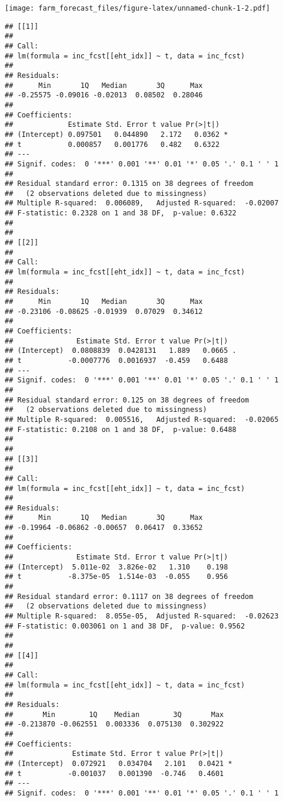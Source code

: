 \documentclass[]{article}
\begin{document}
\texttt{[image: farm\_forecast\_files/figure-latex/unnamed-chunk-1-2.pdf]}

\begin{verbatim}
## [[1]]
## 
## Call:
## lm(formula = inc_fcst[[eht_idx]] ~ t, data = inc_fcst)
## 
## Residuals:
##      Min       1Q   Median       3Q      Max 
## -0.25575 -0.09016 -0.02013  0.08502  0.28046 
## 
## Coefficients:
##             Estimate Std. Error t value Pr(>|t|)  
## (Intercept) 0.097501   0.044890   2.172   0.0362 *
## t           0.000857   0.001776   0.482   0.6322  
## ---
## Signif. codes:  0 '***' 0.001 '**' 0.01 '*' 0.05 '.' 0.1 ' ' 1
## 
## Residual standard error: 0.1315 on 38 degrees of freedom
##   (2 observations deleted due to missingness)
## Multiple R-squared:  0.006089,   Adjusted R-squared:  -0.02007 
## F-statistic: 0.2328 on 1 and 38 DF,  p-value: 0.6322
## 
## 
## [[2]]
## 
## Call:
## lm(formula = inc_fcst[[eht_idx]] ~ t, data = inc_fcst)
## 
## Residuals:
##      Min       1Q   Median       3Q      Max 
## -0.23106 -0.08625 -0.01939  0.07029  0.34612 
## 
## Coefficients:
##               Estimate Std. Error t value Pr(>|t|)  
## (Intercept)  0.0808839  0.0428131   1.889   0.0665 .
## t           -0.0007776  0.0016937  -0.459   0.6488  
## ---
## Signif. codes:  0 '***' 0.001 '**' 0.01 '*' 0.05 '.' 0.1 ' ' 1
## 
## Residual standard error: 0.125 on 38 degrees of freedom
##   (2 observations deleted due to missingness)
## Multiple R-squared:  0.005516,   Adjusted R-squared:  -0.02065 
## F-statistic: 0.2108 on 1 and 38 DF,  p-value: 0.6488
## 
## 
## [[3]]
## 
## Call:
## lm(formula = inc_fcst[[eht_idx]] ~ t, data = inc_fcst)
## 
## Residuals:
##      Min       1Q   Median       3Q      Max 
## -0.19964 -0.06862 -0.00657  0.06417  0.33652 
## 
## Coefficients:
##               Estimate Std. Error t value Pr(>|t|)
## (Intercept)  5.011e-02  3.826e-02   1.310    0.198
## t           -8.375e-05  1.514e-03  -0.055    0.956
## 
## Residual standard error: 0.1117 on 38 degrees of freedom
##   (2 observations deleted due to missingness)
## Multiple R-squared:  8.055e-05,  Adjusted R-squared:  -0.02623 
## F-statistic: 0.003061 on 1 and 38 DF,  p-value: 0.9562
## 
## 
## [[4]]
## 
## Call:
## lm(formula = inc_fcst[[eht_idx]] ~ t, data = inc_fcst)
## 
## Residuals:
##       Min        1Q    Median        3Q       Max 
## -0.213870 -0.062551  0.003336  0.075130  0.302922 
## 
## Coefficients:
##              Estimate Std. Error t value Pr(>|t|)  
## (Intercept)  0.072921   0.034704   2.101   0.0421 *
## t           -0.001037   0.001390  -0.746   0.4601  
## ---
## Signif. codes:  0 '***' 0.001 '**' 0.01 '*' 0.05 '.' 0.1 ' ' 1

\end{verbatim}
\end{document}
